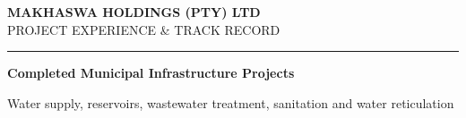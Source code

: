 \documentclass[a4paper,landscape,10pt]{article}
\renewcommand{\arraystretch}{1.55}
\begin{document}
\noindent
\colorbox{MHNavy}{%
  \parbox{\dimexpr\textwidth-2\fboxsep\relax}{%
    \vspace{0.38cm}\hspace{0.37cm}%
    {\Large\bfseries\color{white}
    MAKHASWA HOLDINGS (PTY) LTD}\\[5pt]
    \hspace{0.37cm}%
    {\normalsize\color{white}
    PROJECT EXPERIENCE \& TRACK RECORD}%
    \vspace{0.35cm}%
  }%
}

\vspace{0.10cm}
\noindent
\color{MHGold}\rule{\textwidth}{1.5pt}

\vspace{0.50cm}

{\large\bfseries\color{MHNavy}
Completed Municipal Infrastructure Projects}\par

\vspace{0.14cm}

{\small\color{MHMuted}
Water supply, reservoirs, wastewater treatment,
sanitation and water reticulation}\par

\vspace{0.35cm}

\begingroup

\fontsize{9.0pt}{11.8pt}\selectfont
\color{MHText}
\renewcommand{\arraystretch}{1.55}
\end{document}
